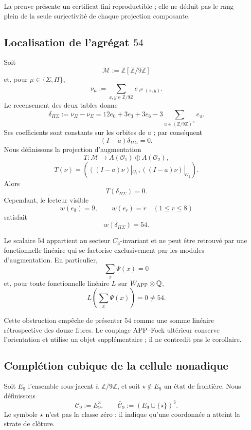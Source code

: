 La preuve présente un certificat fini reproductible ; elle ne déduit pas le rang plein
de la seule surjectivité de chaque projection composante.

\subsection{Localisation de l’agrégat \texorpdfstring{\(54\)}{54}}

Soit
\[
 \mathcal M:=\mathbb Z[\mathbb Z/9\mathbb Z]
\]
et, pour \(\mu\in\{\Sigma,\Pi\}\),
\[
 \nu_\mu:=\sum_{x,y\in\mathbb Z/9\mathbb Z}
 e_{\ell^\mu(x,y)}.
\]
Le recensement des deux tables donne
\[
 \delta_{\Pi\Sigma}:=\nu_\Pi-\nu_\Sigma
 =12e_0+3e_3+3e_6
 -3\sum_{u\in(\mathbb Z/9\mathbb Z)^\times}e_u.
\]
Ses coefficients sont constants sur les orbites de \(a\) ; par conséquent
\[
 (I-a)\delta_{\Pi\Sigma}=0.
\]
Nous définissons la projection d’augmentation
\[
 T:\mathcal M\longrightarrow
 A(\mathcal O_1)\oplus A(\mathcal O_2),
\]
\[
 T(\nu)=
 \left(((I-a)\nu)|_{\mathcal O_1},
       ((I-a)\nu)|_{\mathcal O_2}\right).
\]
Alors
\[
 T(\delta_{\Pi\Sigma})=0.
\]
Cependant, le lecteur visible
\[
 w(e_0)=9,
 \qquad w(e_r)=r\quad(1\leq r\leq8)
\]
satisfait
\[
 w(\delta_{\Pi\Sigma})=54.
\]

\begin{corollary}
\label{p12-83-c1-s5:cor:obstruccion-isotipica-app-autonoma}
Le scalaire \(54\) appartient au secteur \(C_3\)-invariant et ne peut
être retrouvé par une fonctionnelle linéaire qui se factorise exclusivement par
les modules d’augmentation. En particulier,
\[
 \sum_x\Psi(x)=0
\]
et, pour toute fonctionnelle linéaire \(L\) sur \(W_{\rm APP}\otimes\mathbb Q\),
\[
 L\!\left(\sum_x\Psi(x)\right)=0\neq54.
\]
\end{corollary}

Cette obstruction empêche de présenter \(54\) comme une somme linéaire rétrospective
des douze fibres. Le couplage APP--Fock ultérieur conserve
l’orientation et utilise un objet supplémentaire ; il ne contredit pas le corollaire.

\subsection{Complétion cubique de la cellule nonadique}

Soit \(E_9\) l’ensemble sous-jacent à \(\mathbb Z/9\mathbb Z\), et soit
\(\star\notin E_9\) un état de frontière. Nous définissons
\[
 \mathcal C_9:=E_9^3,
 \qquad
 \overline{\mathcal C}_9:=(E_9\sqcup\{\star\})^3.
\]
Le symbole \(\star\) n’est pas la classe zéro : il indique qu’une coordonnée a
atteint la strate de clôture.

